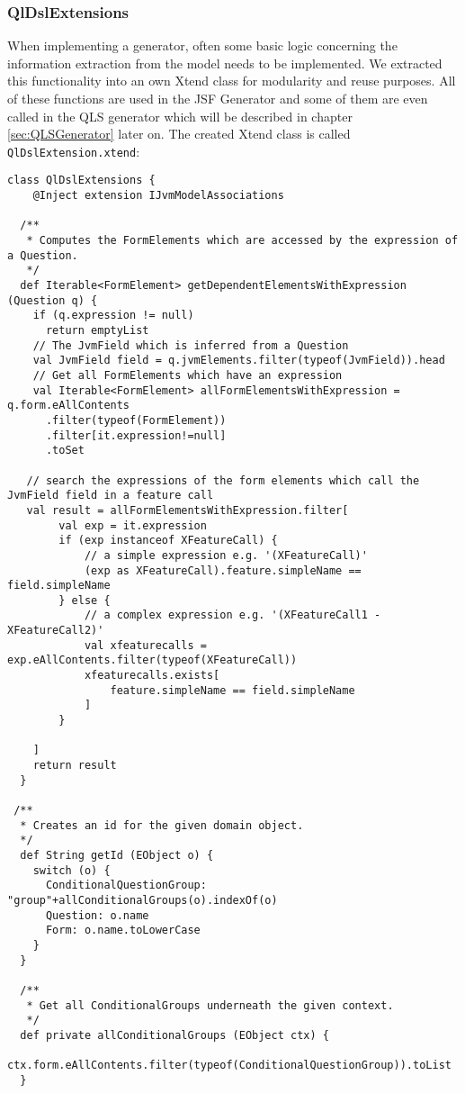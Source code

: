 \subsubsection*{QlDslExtensions}

When implementing a generator, often some basic logic concerning the
information extraction from the model needs to be implemented. We extracted this
functionality into an own Xtend class for modularity and reuse purposes. All of
these functions are used in the JSF Generator and some of them are even called
in the QLS generator which will be described in chapter \ref{sec:QLSGenerator} 
later on. The created Xtend class is called \texttt{QlDslExtension.xtend}:

\begin{lstlisting}[language=Xtend]
class QlDslExtensions {
	@Inject extension IJvmModelAssociations

  /**
   * Computes the FormElements which are accessed by the expression of a Question.
   */
  def Iterable<FormElement> getDependentElementsWithExpression (Question q) {
    if (q.expression != null)
      return emptyList
    // The JvmField which is inferred from a Question
    val JvmField field = q.jvmElements.filter(typeof(JvmField)).head
    // Get all FormElements which have an expression 
    val Iterable<FormElement> allFormElementsWithExpression = q.form.eAllContents
      .filter(typeof(FormElement))
      .filter[it.expression!=null]
      .toSet
      
   // search the expressions of the form elements which call the JvmField field in a feature call
   val result = allFormElementsWithExpression.filter[
    	val exp = it.expression
    	if (exp instanceof XFeatureCall) {
    		// a simple expression e.g. '(XFeatureCall)'
    		(exp as XFeatureCall).feature.simpleName == field.simpleName	
    	} else {
    		// a complex expression e.g. '(XFeatureCall1 - XFeatureCall2)'
	        val xfeaturecalls = exp.eAllContents.filter(typeof(XFeatureCall))
	        xfeaturecalls.exists[
	        	feature.simpleName == field.simpleName
	        ]
    	}
    
	]
    return result
  }

 /**
  * Creates an id for the given domain object. 
  */
  def String getId (EObject o) {
    switch (o) {
      ConditionalQuestionGroup: "group"+allConditionalGroups(o).indexOf(o)
      Question: o.name
      Form: o.name.toLowerCase
    }
  }
  
  /**
   * Get all ConditionalGroups underneath the given context.
   */
  def private allConditionalGroups (EObject ctx) {
    ctx.form.eAllContents.filter(typeof(ConditionalQuestionGroup)).toList
  }


\end{lstlisting}
